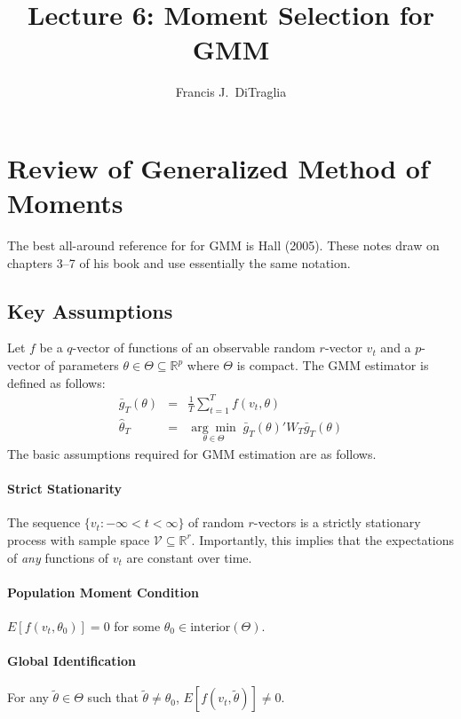 \documentclass[12pt]{article}
\theoremstyle{definition}
\begin{document}
\title{Lecture 6: Moment Selection for GMM}

\author{Francis J.\ DiTraglia}

\maketitle 

\section{Review of Generalized Method of Moments}
The best all-around reference for for GMM is Hall (2005). These notes draw on chapters 3--7 of his book and use essentially the same notation.

\subsection{Key Assumptions}
Let $f$ be a $q$-vector of functions of an observable random $r$-vector $v_t$ and a $p$-vector of parameters $\theta \in \Theta \subseteq \mathbb{R}^p$ where $\Theta$ is compact. The GMM estimator is defined as follows:
	\begin{eqnarray*}
		\bar{g}_T(\theta) &=& \frac{1}{T}\sum_{t=1}^T f(v_t, \theta)\\
		\widehat{\theta}_T &=& \underset{\theta \in \Theta}{\arg \min} \; \bar{g}_T(\theta)'W_T \bar{g}_T(\theta) 
	\end{eqnarray*}
The basic assumptions required for GMM estimation are as follows.

\paragraph{Strict Stationarity} The sequence $\{v_t\colon -\infty <t <\infty\}$ of random $r$-vectors is a strictly stationary process with sample space $\mathcal{V}\subseteq \mathbb{R}^r$. Importantly, this implies that the expectations of \emph{any} functions of $v_t$ are constant over time.

\paragraph{Population Moment Condition} $E[f(v_t, \theta_0)]=0$ for some $\theta_0 \in \mbox{interior}(\Theta)$.

\paragraph{Global Identification} For any $\widetilde{\theta}\in \Theta$ such that $\widetilde{\theta}\neq \theta_0$, $E[f(v_t,\widetilde{\theta})]\neq 0 $.
\end{document}
